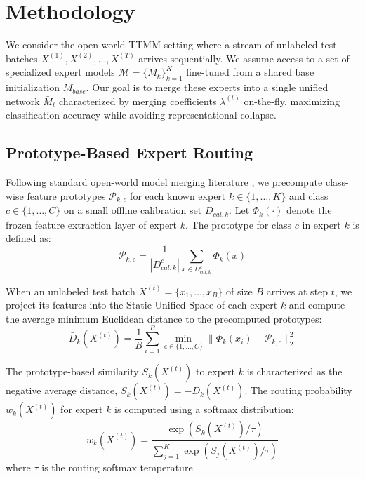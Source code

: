 \documentclass{article}
\theoremstyle{plain}
\theoremstyle{definition}
\theoremstyle{remark}
\begin{document}
\section{Methodology}
\label{sec:method}

We consider the open-world TTMM setting where a stream of unlabeled test batches $X^{(1)}, X^{(2)}, \dots, X^{(T)}$ arrives sequentially. We assume access to a set of specialized expert models $\mathcal{M} = \{M_k\}_{k=1}^K$ fine-tuned from a shared base initialization $M_{base}$. Our goal is to merge these experts into a single unified network $\bar{M}_t$ characterized by merging coefficients $\lambda^{(t)}$ on-the-fly, maximizing classification accuracy while avoiding representational collapse.

\subsection{Prototype-Based Expert Routing}
Following standard open-world model merging literature \cite{anonymous2026iggsow}, we precompute class-wise feature prototypes $\mathcal{P}_{k, c}$ for each known expert $k \in \{1, \dots, K\}$ and class $c \in \{1, \dots, C\}$ on a small offline calibration set $D_{cal, k}$. Let $\Phi_k(\cdot)$ denote the frozen feature extraction layer of expert $k$. The prototype for class $c$ in expert $k$ is defined as:
\begin{equation}
  \mathcal{P}_{k, c} = \frac{1}{|D_{cal, k}^c|} \sum_{x \in D_{cal, k}^c} \Phi_k(x)
\end{equation}

When an unlabeled test batch $X^{(t)} = \{x_1, \dots, x_B\}$ of size $B$ arrives at step $t$, we project its features into the Static Unified Space of each expert $k$ and compute the average minimum Euclidean distance to the precomputed prototypes:
\begin{equation}
  \bar{D}_k(X^{(t)}) = \frac{1}{B} \sum_{i=1}^B \min_{c \in \{1, \dots, C\}} \|\Phi_k(x_i) - \mathcal{P}_{k, c}\|_2^2
\end{equation}

The prototype-based similarity $S_k(X^{(t)})$ to expert $k$ is characterized as the negative average distance, $S_k(X^{(t)}) = -\bar{D}_k(X^{(t)})$. The routing probability $w_k(X^{(t)})$ for expert $k$ is computed using a softmax distribution:
\begin{equation}
  w_k(X^{(t)}) = \frac{\exp(S_k(X^{(t)}) / \tau)}{\sum_{j=1}^K \exp(S_j(X^{(t)}) / \tau)}
  \label{eq:softmax}
\end{equation}
where $\tau$ is the routing softmax temperature.
\end{document}
